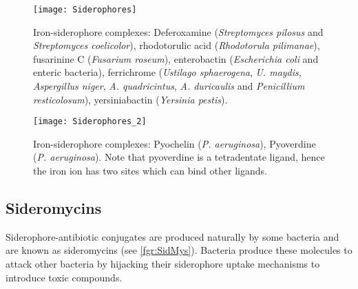 \begin{figure}[H]
	\begin{center}
		\texttt{[image: Siderophores]}
		\caption{Iron-siderophore complexes:
		Deferoxamine \cite{Zheng2012} (\textit{Streptomyces pilosus} and \textit{Streptomyces coelicolor}), 
		rhodotorulic acid \cite{Carrano1978} (\textit{Rhodotorula pilimanae}),
		fusarinine C \cite{Hossain1980} (\textit{Fusarium roseum}),
		enterobactin \cite{Zheng2012} (\textit{Escherichia coli} and enteric bacteria),
		ferrichrome \cite{vanderHelm1980} (\textit{Ustilago sphaerogena}, \textit{U. maydis}, \textit{Aspergillus niger}, \textit{A. quadricintus}, \textit{A. duricaulis} and \textit{Penicillium resticolosum}),
		yersiniabactin \cite{Zheng2012} (\textit{Yersinia pestis}).
		\label{fgr:Sids}}
	\end{center}
\end{figure}

\begin{figure}[H]
	\begin{center}
		\texttt{[image: Siderophores\_2]}
		\caption{Iron-siderophore complexes:
		Pyochelin \cite{Schlegel2006} (\textit{P. aeruginosa}),
		Pyoverdine \cite{Zheng2012} (\textit{P. aeruginosa}). Note that pyoverdine  is a tetradentate ligand, hence the iron ion has two sites which can bind other ligands. \label{fgr:Sids_2}}
	\end{center}
\end{figure}

\subsection{Sideromycins}


Siderophore-antibiotic conjugates are produced naturally by some bacteria and are known as sideromycins\cite{Page2013} (see \ref{fgr:SidMys}). Bacteria produce these molecules to attack other bacteria by hijacking their siderophore uptake mechanisms to introduce toxic compounds. 

